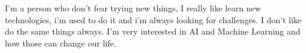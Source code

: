 \documentclass[9pt]{developercv} %
\begin{document}
\vspace{0.5cm}



\begin{minipage}[t]{0.4\textwidth} %
	\vspace{-\baselineskip} %
	
	I'm a person who don't fear trying new things, I really like learn new technologies, i'm used to do it and i'm always looking for challenges. I don't like do the same things always. I'm very interested in AI and Machine Learning and how those can change our life.\\ %
\end{minipage}
\hfill %
\begin{minipage}[t]{0.5\textwidth} %
	\vspace{-\baselineskip} %
	\begin{barchart}{5.5}
	\end{barchart}
\end{minipage}

\begin{center}
\end{center}


\end{document}

